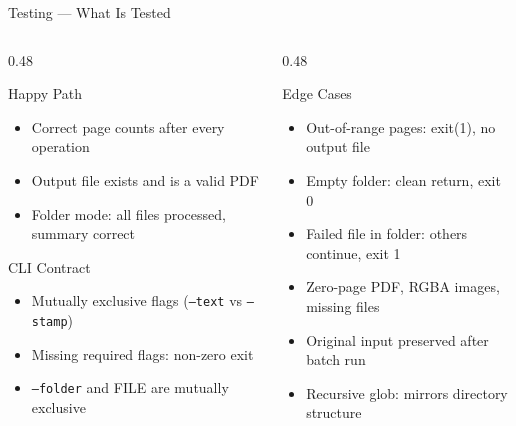 \documentclass[aspectratio=169]{beamer}
\begin{document}
\begin{frame}{Testing --- What Is Tested}
  \begin{columns}[T]
    \begin{column}{0.48\textwidth}
      \begin{block}{Happy Path}
        \begin{itemize}
          \item Correct page counts after every operation
          \item Output file exists and is a valid PDF
          \item Folder mode: all files processed, summary correct
        \end{itemize}
      \end{block}
      \vspace{8pt}
      \begin{block}{CLI Contract}
        \begin{itemize}
          \item Mutually exclusive flags
                (\texttt{--text} vs \texttt{--stamp})
          \item Missing required flags: non-zero exit
          \item \texttt{--folder} and FILE are mutually exclusive
        \end{itemize}
      \end{block}
    \end{column}
    \begin{column}{0.48\textwidth}
      \begin{block}{Edge Cases}
        \begin{itemize}
          \item Out-of-range pages: exit(1), no output file
          \item Empty folder: clean return, exit 0
          \item Failed file in folder: others continue, exit 1
          \item Zero-page PDF, RGBA images, missing files
          \item Original input preserved after batch run
          \item Recursive glob: mirrors directory structure
        \end{itemize}
      \end{block}
    \end{column}
  \end{columns}
\end{frame}
\end{document}

